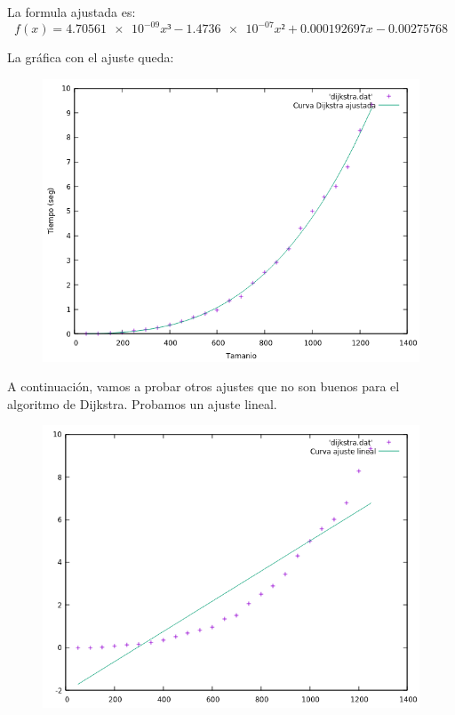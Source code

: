 \documentclass[12pt, spanish]{article}
\begin{document}
\newpage

La formula ajustada es:
\[f(x)= \num{4.70561e-09}x³ - \num{1.4736e-07}x² + 0.000192697x - 0.00275768\]

La gráfica con el ajuste queda:
\begin{figure}[H]
  \centering
  \includegraphics[scale = 0.7]{AjusteDijkstra.png}
\end{figure}

A continuación, vamos a probar otros ajustes que no son buenos para el algoritmo de Dijkstra. Probamos un ajuste lineal.

\begin{figure}[H]
  \centering
  \includegraphics[scale = 0.7]{AjusteLinealDijkstra.png}
\end{figure}
\end{document}
